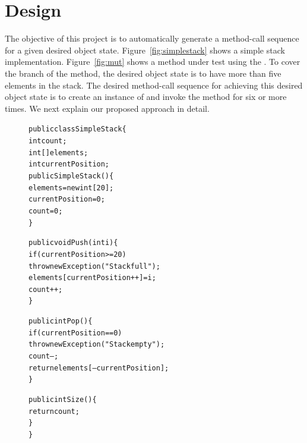 \section{Design}
\label{design}

The objective of this project is to automatically generate a method-call sequence for a given desired object state. Figure~\ref{fig:simplestack} shows a simple stack implementation. Figure~\ref{fig:mut} shows a method under test using the . To cover the  branch of the  method, the desired object state is to have more than five elements in the stack. The desired method-call sequence for achieving this desired object state is to create an instance of  and invoke the  method for six or more times. We next explain our proposed approach in detail.

\begin{figure}[t]
\begin{CodeOut}
\begin{alltt}
public class SimpleStack \{
\hspace*{0.2in}int count;
\hspace*{0.2in}int[] elements;
\hspace*{0.2in}int currentPosition;
\hspace*{0.2in}public SimpleStack() \{
\hspace*{0.3in}elements = new int[20];
\hspace*{0.3in}currentPosition = 0;
\hspace*{0.3in}count = 0;
\hspace*{0.2in}\}

\hspace*{0.2in}public void Push(int i) \{
\hspace*{0.3in}if (currentPosition >= 20)
\hspace*{0.4in}throw new Exception("Stack full");
\hspace*{0.3in}elements[currentPosition++] = i;
\hspace*{0.3in}count++;
\hspace*{0.2in}\}

\hspace*{0.2in}public int Pop() \{
\hspace*{0.3in}if (currentPosition == 0)
\hspace*{0.4in}throw new Exception("Stack empty");
\hspace*{0.3in}count--;
\hspace*{0.3in}return elements[--currentPosition];
\hspace*{0.2in}\}

\hspace*{0.2in}public int Size() \{
\hspace*{0.3in}return count;
\hspace*{0.2in}\}
\}
\end{alltt}
\end{CodeOut}
\end{figure}

